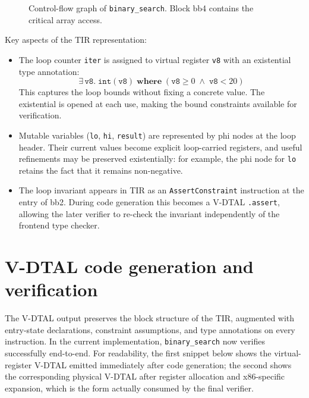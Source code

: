 \begin{figure}[H]
  \caption{Control-flow graph of \texttt{binary\_search}. Block bb4 contains the critical array access.}
  \label{fig:bs-cfg}
\end{figure}
%
Key aspects of the TIR representation:
%
\begin{itemize}
  \item The loop counter \texttt{iter} is assigned to virtual register \texttt{v8} with an existential type annotation:
    \[
      \exists\, \texttt{v8}.\; \mathtt{int}(\texttt{v8}) \;\mathbf{where}\; (\texttt{v8} \ge 0 \;\wedge\; \texttt{v8} < 20)
    \]
    This captures the loop bounds without fixing a concrete value. The existential is opened at each use, making the bound constraints available for verification.
  \item Mutable variables (\texttt{lo}, \texttt{hi}, \texttt{result}) are represented by phi nodes at the loop header. Their current values become explicit loop-carried registers, and useful refinements may be preserved existentially: for example, the phi node for \texttt{lo} retains the fact that it remains non-negative.
  \item The loop invariant appears in TIR as an \texttt{AssertConstraint} instruction at the entry of bb2. During code generation this becomes a V-DTAL \texttt{.assert}, allowing the later verifier to re-check the invariant independently of the frontend type checker.
\end{itemize}

\section{V-DTAL code generation and verification}
%
The V-DTAL output preserves the block structure of the TIR, augmented with entry-state declarations, constraint assumptions, and type annotations on every instruction. In the current implementation, \texttt{binary\_search} now verifies successfully end-to-end. For readability, the first snippet below shows the virtual-register V-DTAL emitted immediately after code generation; the second shows the corresponding physical V-DTAL after register allocation and x86-specific expansion, which is the form actually consumed by the final verifier.
%
